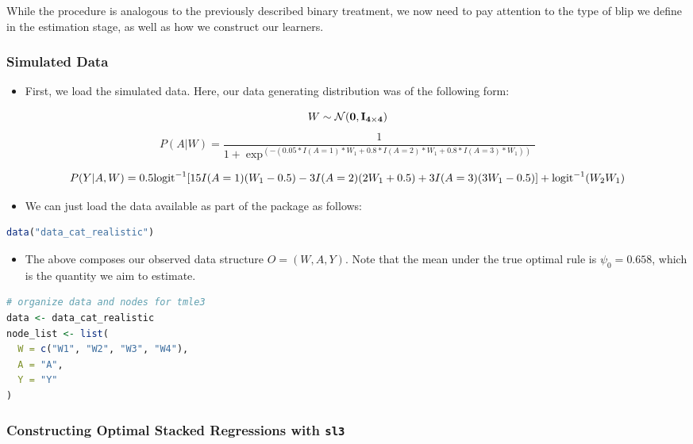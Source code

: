 \documentclass[
  12pt, krantz2,
]{book}
\providecommand{\tightlist}{%
  \setlength{\itemsep}{0pt}\setlength{\parskip}{0pt}}
\theoremstyle{definition}
\theoremstyle{definition}
\theoremstyle{definition}
\newcommand{\1}{\mathbbm{1}}
\begin{document}
While the procedure is analogous to the previously described binary treatment,
we now need to pay attention to the type of blip we define in the estimation
stage, as well as how we construct our learners.

\hypertarget{simulated-data}{%
\subsubsection{Simulated Data}\label{simulated-data}}

\begin{itemize}
\tightlist
\item
  First, we load the simulated data. Here, our data generating distribution was
  of the following form:
\end{itemize}

\[W \sim \mathcal{N}(\bf{0},I_{4 \times 4})\]
\[P(A|W) = \frac{1}{1+\exp^{(-(0.05*I(A=1)*W_1+0.8*I(A=2)*W_1+0.8*I(A=3)*W_1))}}\]

\[P(Y|A,W) = 0.5\text{logit}^{-1}[15I(A=1)(W_1-0.5) - 3I(A=2)(2W_1+0.5) \\
+ 3I(A=3)(3W_1-0.5)] +\text{logit}^{-1}(W_2W_1)\]

\begin{itemize}
\tightlist
\item
  We can just load the data available as part of the package as follows:
\end{itemize}

\begin{lstlisting}[language=R]
data("data_cat_realistic")
\end{lstlisting}

\begin{itemize}
\tightlist
\item
  The above composes our observed data structure \(O = (W, A, Y)\). Note that the
  mean under the true optimal rule is \(\psi_0=0.658\), which is the quantity we
  aim to estimate.
\end{itemize}

\begin{lstlisting}[language=R]
# organize data and nodes for tmle3
data <- data_cat_realistic
node_list <- list(
  W = c("W1", "W2", "W3", "W4"),
  A = "A",
  Y = "Y"
)
\end{lstlisting}

\hypertarget{constructing-optimal-stacked-regressions-with-sl3-1}{%
\subsubsection{\texorpdfstring{Constructing Optimal Stacked Regressions with \texttt{sl3}}{Constructing Optimal Stacked Regressions with sl3}}\label{constructing-optimal-stacked-regressions-with-sl3-1}}
\end{document}
